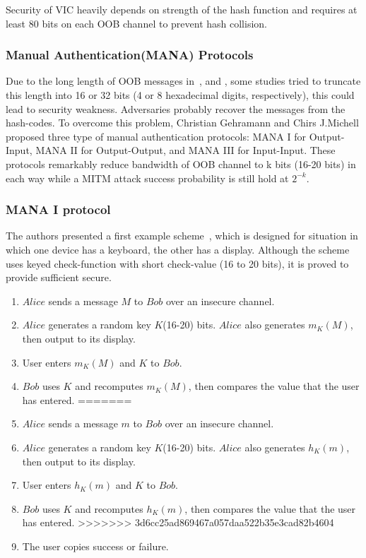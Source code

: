 Security of VIC heavily depends on strength of the hash function and requires at least 80 bits on each OOB channel to prevent hash collision. 
 
\subsubsection{Manual Authentication(MANA) Protocols}

Due to the long length of OOB messages in~\cite{1624021}, and \cite{Smetters02talkingto}, some studies tried to truncate this length into 16 or 32 bits (4 or 8 hexadecimal digits, respectively), this could lead to security weakness. Adversaries probably recover the messages from the hash-codes. To overcome this problem, Christian Gehramann and Chirs J.Michell \cite{Mitchell:2004p25948} proposed three type of manual authentication protocols: MANA I for Output-Input, MANA II for Output-Output, and MANA III for Input-Input. These protocols remarkably reduce bandwidth of OOB channel to k bits (16-20 bits) in each way while a MITM attack success probability is still hold at $2^{-k}$. 

\subsubsection*{MANA I protocol}

The authors presented a first example scheme~\cite{Mitchell:2004p25948}, which is designed for situation in which one device has a keyboard, the other has a display. Although the scheme uses keyed check-function with short check-value (16 to 20 bits), it is proved to provide sufficient secure. 

\begin{enumerate}
<<<<<<< HEAD
\item $Alice$ sends a message $M$ to $Bob$ over an insecure channel. 
\item $Alice$ generates a random key $K$(16-20) bits. $Alice$ also generates $m_K(M)$, then output to its display.
\item User enters $m_K(M)$ and $K$ to $Bob$.
\item $Bob$ uses $K$ and recomputes $m_K(M)$, then compares the value that the user has entered.
=======
\item $Alice$ sends a message $m$ to $Bob$ over an insecure channel. 
\item $Alice$ generates a random key $K$(16-20) bits. $Alice$ also generates $h_K(m)$, then output to its display.
\item User enters $h_K(m)$ and $K$ to $Bob$.
\item $Bob$ uses $K$ and recomputes $h_K(m)$, then compares the value that the user has entered.
>>>>>>> 3d6cc25ad869467a057daa522b35e3cad82b4604
\item The user copies success or failure. 
\end{enumerate}

